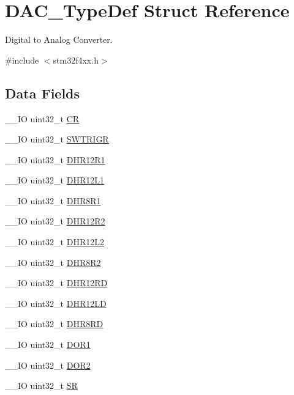 \hypertarget{struct_d_a_c___type_def}{\section{D\-A\-C\-\_\-\-Type\-Def Struct Reference}
\label{struct_d_a_c___type_def}
}


Digital to Analog Converter.  




{\ttfamily \#include $<$stm32f4xx.\-h$>$}

\subsection*{Data Fields}
\begin{DoxyCompactItemize}
\item 
\-\_\-\-\_\-\-I\-O uint32\-\_\-t \hyperlink{struct_d_a_c___type_def_ab40c89c59391aaa9d9a8ec011dd0907a}{C\-R}
\item 
\-\_\-\-\_\-\-I\-O uint32\-\_\-t \hyperlink{struct_d_a_c___type_def_a896bbb7153af0b67ad772360feaceeb4}{S\-W\-T\-R\-I\-G\-R}
\item 
\-\_\-\-\_\-\-I\-O uint32\-\_\-t \hyperlink{struct_d_a_c___type_def_ac2bb55b037b800a25852736afdd7a258}{D\-H\-R12\-R1}
\item 
\-\_\-\-\_\-\-I\-O uint32\-\_\-t \hyperlink{struct_d_a_c___type_def_ae9028b8bcb5118b7073165fb50fcd559}{D\-H\-R12\-L1}
\item 
\-\_\-\-\_\-\-I\-O uint32\-\_\-t \hyperlink{struct_d_a_c___type_def_ad0a200e12acad17a5c7d2059159ea7e1}{D\-H\-R8\-R1}
\item 
\-\_\-\-\_\-\-I\-O uint32\-\_\-t \hyperlink{struct_d_a_c___type_def_a804c7e15dbb587c7ea25511f6a7809f7}{D\-H\-R12\-R2}
\item 
\-\_\-\-\_\-\-I\-O uint32\-\_\-t \hyperlink{struct_d_a_c___type_def_a2e45f9c9d67e384187b25334ba0a3e3d}{D\-H\-R12\-L2}
\item 
\-\_\-\-\_\-\-I\-O uint32\-\_\-t \hyperlink{struct_d_a_c___type_def_a4c435f0e34ace4421241cd5c3ae87fc2}{D\-H\-R8\-R2}
\item 
\-\_\-\-\_\-\-I\-O uint32\-\_\-t \hyperlink{struct_d_a_c___type_def_a1590b77e57f17e75193da259da72095e}{D\-H\-R12\-R\-D}
\item 
\-\_\-\-\_\-\-I\-O uint32\-\_\-t \hyperlink{struct_d_a_c___type_def_acc269320aff0a6482730224a4b641a59}{D\-H\-R12\-L\-D}
\item 
\-\_\-\-\_\-\-I\-O uint32\-\_\-t \hyperlink{struct_d_a_c___type_def_a9590269cba8412f1be96b0ddb846ef44}{D\-H\-R8\-R\-D}
\item 
\-\_\-\-\_\-\-I\-O uint32\-\_\-t \hyperlink{struct_d_a_c___type_def_aa710505be03a41981c35bacc7ce20746}{D\-O\-R1}
\item 
\-\_\-\-\_\-\-I\-O uint32\-\_\-t \hyperlink{struct_d_a_c___type_def_aba9fb810b0cf6cbc1280c5c63be2418b}{D\-O\-R2}
\item 
\-\_\-\-\_\-\-I\-O uint32\-\_\-t \hyperlink{struct_d_a_c___type_def_af6aca2bbd40c0fb6df7c3aebe224a360}{S\-R}
\end{DoxyCompactItemize}



